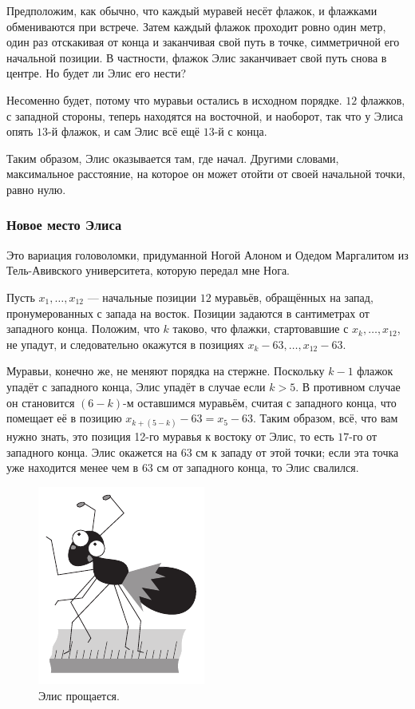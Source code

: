 Предположим, как обычно, что каждый муравей несёт флажок, и флажками обмениваются при встрече.
Затем каждый флажок проходит ровно один метр, один раз отскакивая от конца и заканчивая свой путь в точке, симметричной его начальной позиции.
В частности, флажок Элис заканчивает свой путь снова в центре. Но будет ли Элис его нести?

Несоменно будет, потому что муравьи остались в исходном порядке.
$12$ флажков, с западной стороны, теперь находятся на восточной, и наоборот, так что у Элиса опять $13$-й флажок, и сам Элис всё ещё $13$-й с конца.

Таким образом, Элис оказывается там, где начал.
Другими словами, максимальное расстояние, на которое он может отойти от своей начальной точки, равно нулю.

\subsubsection*{Новое место Элиса}

Это вариация головоломки, придуманной Ногой Алоном и Одедом Маргалитом из Тель-Авивского университета, которую передал мне Нога.

Пусть $x_1,\dots,x_{12}$ --- начальные позиции $12$ муравьёв, обращённых на запад, пронумерованных с запада на восток.
Позиции задаются в сантиметрах от западного конца.
Положим, что $k$ таково, что флажки, стартовавшие с $x_k,\dots,x_{12}$, не упадут, и следовательно окажутся в позициях $x_k-63,\dots,x_{12}-63$.

Муравьи, конечно же, не меняют порядка на стержне.
Поскольку $k-1$ флажок упадёт с западного конца, Элис упадёт в случае если $k> 5$.
В противном случае он становится $(6-k)$-м оставшимся муравьём, считая с западного конца, что помещает её в позицию $x_{k+(5-k)}-63=x_5-63$.
Таким образом, всё, что вам нужно знать, это позиция 12-го муравья к востоку от Элис, то есть $17$-го от западного конца.
Элис окажется на $63$ см к западу от этой точки;
если эта точка уже находится менее чем в $63$ см от западного конца, то Элис свалился.

\begin{figure}[ht!]
\centering
\includegraphics[scale=1]{pics/alice2}
\caption{Элис прощается.}
\label{pic:alice2}
\end{figure}
